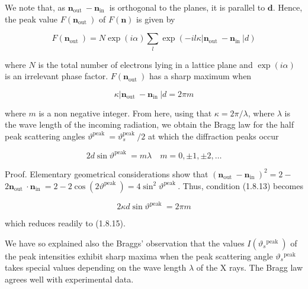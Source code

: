 \documentclass{article}
\begin{document}
We note that, as $\boldsymbol{n}_{\text {out }}-\boldsymbol{n}_{\text {in }}$ is orthogonal to the planes, it is parallel to $\boldsymbol{d}$. Hence, the peak value $F\left(\boldsymbol{n}_{\text {out }}\right)$ of $F(\boldsymbol{n})$ is given by
 
\begin{equation*}
F\left(\boldsymbol{n}_{\text {out }}\right)=N \exp (i \alpha) \sum_{l} \exp \left(-i l \kappa\left|\boldsymbol{n}_{\text {out }}-\boldsymbol{n}_{\text {in }}\right| d\right) \tag{1.8.13}
\end{equation*}
 
where $N$ is the total number of electrons lying in a lattice plane and $\exp (i \alpha)$ is an irrelevant phase factor. $F\left(\boldsymbol{n}_{\text {out }}\right)$ has a sharp maximum when
 
\begin{equation*}
\kappa\left|\boldsymbol{n}_{\text {out }}-\boldsymbol{n}_{\text {in }}\right| d=2 \pi m \tag{1.8.14}
\end{equation*}
 
where $m$ is a non negative integer. From here, using that $\kappa=2 \pi / \lambda$, where $\lambda$ is
the wave length of the incoming radiation, we obtain the Bragg law for the half peak scattering angles $\vartheta^{\text {peak }}=\vartheta_{s}^{\text {peak }} / 2$ at which the diffraction peaks occur
 
\begin{equation*}
2 d \sin \vartheta^{\text {peak }}=m \lambda \quad m=0, \pm 1, \pm 2, \ldots \tag{1.8.15}
\end{equation*}
 

Proof. Elementary geometrical considerations show that $\left(\boldsymbol{n}_{\text {out }}-\boldsymbol{n}_{\text {in }}\right)^{2}=2-$ $2 \boldsymbol{n}_{\text {out }} \cdot \boldsymbol{n}_{\text {in }}=2-2 \cos \left(2 \vartheta^{\text {peak }}\right)=4 \sin ^{2} \vartheta^{\text {peak }}$. Thus, condition (1.8.13) becomes
 
\begin{equation*}
2 \kappa d \sin \vartheta^{\text {peak }}=2 \pi m \tag{1.8.16}
\end{equation*}
 
which reduces readily to (1.8.15).

We have so explained also the Braggs' observation that the values $I\left(\vartheta_{s}{ }^{\text {peak }}\right)$ of the peak intensities exhibit sharp maxima when the peak scattering angle $\vartheta_{s}{ }^{\text {peak }}$ takes special values depending on the wave length $\lambda$ of the X rays. The Bragg law agrees well with experimental data.
\end{document}
